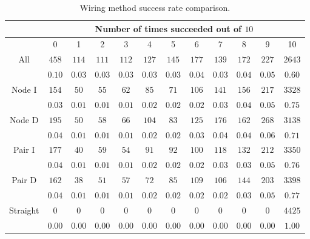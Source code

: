 \begin{table}[H]
\begin{center}
\begin{singlespace}
\begin{tabular}{|c||c|c|c|c|c|c|c|c|c|c|c|}
\hline
 & \multicolumn{11}{|c|}{Number of times succeeded out of $10$} \\
\hline
 & 0 & 1 & 2 & 3 & 4 & 5 & 6 & 7 & 8 & 9 & 10 \\
\hline\hline
All & $458$ & $114$ & $111$ & $112$ & $127$ & $145$ & $177$ & $139$ & $172$ & $227$ & $2643$ \\
 & $0.10$ & $0.03$ & $0.03$ & $0.03$ & $0.03$ & $0.03$ & $0.04$ & $0.03$ & $0.04$ & $0.05$ & $0.60$ \\
\hline
 Node I & $154$ & $50$ & $55$ & $62$ & $85$ & $71$ & $106$ & $141$ & $156$ & $217$ & $3328$ \\
  & $0.03$ & $0.01$ & $0.01$ & $0.01$ & $0.02$ & $0.02$ & $0.02$ & $0.03$ & $0.04$ & $0.05$ & $0.75$ \\
\hline
  Node D & $195$ & $50$ & $58$ & $66$ & $104$ & $83$ & $125$ & $176$ & $162$ & $268$ & $3138$ \\
   & $0.04$ & $0.01$ & $0.01$ & $0.01$ & $0.02$ & $0.02$ & $0.03$ & $0.04$ & $0.04$ & $0.06$ & $0.71$ \\
\hline
   Pair I & $177$ & $40$ & $59$ & $54$ & $91$ & $92$ & $100$ & $118$ & $132$ & $212$ & $3350$ \\
    & $0.04$ & $0.01$ & $0.01$ & $0.01$ & $0.02$ & $0.02$ & $0.02$ & $0.03$ & $0.03$ & $0.05$ & $0.76$ \\
\hline
    Pair D & $162$ & $38$ & $51$ & $57$ & $72$ & $85$ & $109$ & $106$ & $144$ & $203$ & $3398$ \\
     & $0.04$ & $0.01$ & $0.01$ & $0.01$ & $0.02$ & $0.02$ & $0.02$ & $0.02$ & $0.03$ & $0.05$ & $0.77$ \\
\hline
     Straight & $0$ & $0$ & $0$ & $0$ & $0$ & $0$ & $0$ & $0$ & $0$ & $0$ & $4425$ \\
      & $0.00$ & $0.00$ & $0.00$ & $0.00$ & $0.00$ & $0.00$ & $0.00$ & $0.00$ & $0.00$ & $0.00$ & $1.00$ \\
\hline
\end{tabular}
\end{singlespace}
\end{center}
\caption[Wiring method success rate comparison]{Wiring method success rate
comparison.}
\label{tb:wiring_success}
\end{table}

